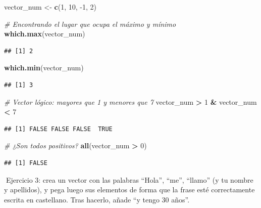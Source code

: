 \documentclass[11pt,]{book}
\newenvironment{Shaded}{\begin{snugshade}}{\end{snugshade}}
\newcommand{\CommentTok}[1]{\textcolor[rgb]{0.37,0.37,0.37}{\textit{#1}}}
\newcommand{\DecValTok}[1]{\textcolor[rgb]{0.06,0.06,0.06}{#1}}
\newcommand{\KeywordTok}[1]{\textcolor[rgb]{0.27,0.27,0.27}{\textbf{#1}}}
\newcommand{\NormalTok}[1]{#1}
\newcommand{\OperatorTok}[1]{\textcolor[rgb]{0.43,0.43,0.43}{\textbf{#1}}}
\newcommand{\StringTok}[1]{\textcolor[rgb]{0.5,0.5,0.5}{#1}}
\begin{document}
\begin{Shaded}
\begin{Highlighting}[]
\NormalTok{vector_num <-}\StringTok{ }\KeywordTok{c}\NormalTok{(}\DecValTok{1}\NormalTok{, }\DecValTok{10}\NormalTok{, }\DecValTok{-1}\NormalTok{, }\DecValTok{2}\NormalTok{)}

\CommentTok{# Encontrando el lugar que ocupa el máximo y mínimo}
\KeywordTok{which.max}\NormalTok{(vector_num)}
\end{Highlighting}
\end{Shaded}

\begin{verbatim}
## [1] 2
\end{verbatim}

\begin{Shaded}
\begin{Highlighting}[]
\KeywordTok{which.min}\NormalTok{(vector_num)}
\end{Highlighting}
\end{Shaded}

\begin{verbatim}
## [1] 3
\end{verbatim}

\begin{Shaded}
\begin{Highlighting}[]
\CommentTok{# Vector lógico: mayores que 1 y menores que 7}
\NormalTok{vector_num }\OperatorTok{>}\StringTok{ }\DecValTok{1} \OperatorTok{&}\StringTok{ }\NormalTok{vector_num }\OperatorTok{<}\StringTok{ }\DecValTok{7}
\end{Highlighting}
\end{Shaded}

\begin{verbatim}
## [1] FALSE FALSE FALSE  TRUE
\end{verbatim}

\begin{Shaded}
\begin{Highlighting}[]
\CommentTok{# ¿Son todos positivos?}
\KeywordTok{all}\NormalTok{(vector_num }\OperatorTok{>}\StringTok{ }\DecValTok{0}\NormalTok{)}
\end{Highlighting}
\end{Shaded}

\begin{verbatim}
## [1] FALSE
\end{verbatim}

📝Ejercicio 3: crea un vector con las palabras ``Hola'', ``me'', ``llamo'' (y tu nombre y apellidos), y pega luego sus elementos de forma que la frase esté correctamente escrita en castellano. Tras hacerlo, añade ``y tengo 30 años''.
\end{document}
